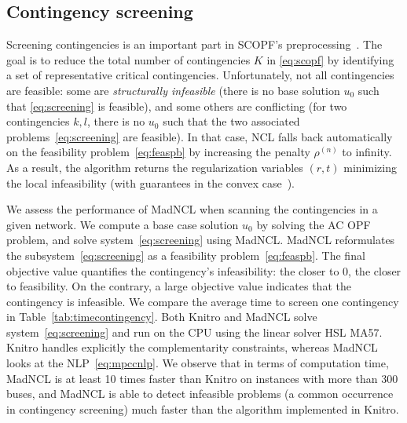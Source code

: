 \documentclass{IEEEtran4PSCC}
\begin{document}
\subsection{Contingency screening}
\label{sec:numerics:screening}
Screening contingencies is an important part in SCOPF's preprocessing~\cite{capitanescu2007contingency}.
The goal is to reduce the total number of contingencies $K$ in \eqref{eq:scopf} by identifying a set of representative critical contingencies.
Unfortunately, not all contingencies are feasible: some
are \emph{structurally infeasible} (there is no base solution $u_0$ such that
\eqref{eq:screening} is feasible), and some others are conflicting (for two contingencies
$k, l$, there is no $u_0$ such that the two associated problems~\eqref{eq:screening} are feasible).
In that case, NCL falls back automatically on the feasibility problem~\eqref{eq:feaspb}
by increasing the penalty $\rho^{(n)}$ to infinity. As a result, the algorithm returns the
regularization variables $(r, t)$ minimizing the local infeasibility (with guarantees in the convex case~\cite{chiche2016augmented}).

We assess the performance of MadNCL when scanning the contingencies in a given network.
We compute a base case solution $u_0$ by solving the AC OPF problem, and solve
system~\eqref{eq:screening} using MadNCL. MadNCL reformulates
the subsystem~\eqref{eq:screening} as a feasibility problem~\eqref{eq:feaspb}.
The final objective value quantifies the contingency's infeasibility: the closer to 0,
the closer to feasibility. On the contrary, a large objective value indicates that the contingency is infeasible.
We compare the average time to screen one contingency in Table~\ref{tab:timecontingency}.
Both Knitro and MadNCL solve system~\eqref{eq:screening} and run on the CPU using the linear solver HSL MA57. Knitro handles explicitly the complementarity constraints, whereas MadNCL
looks at the NLP~\eqref{eq:mpccnlp}. We observe that in terms
of computation time, MadNCL is at least 10 times faster than Knitro on instances
with more than 300 buses, and MadNCL is able to detect
infeasible problems (a common occurrence in contingency screening) much faster than
the algorithm implemented in Knitro.
\end{document}
